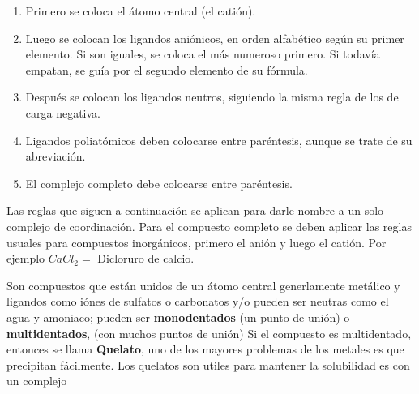 \begin{enumerate}
	\item Primero se coloca el átomo central (el catión).
	\item Luego se colocan los ligandos aniónicos, en orden alfabético según su primer elemento.
	      Si son iguales, se coloca el más numeroso primero. Si todavía empatan, se guía por el
	      segundo elemento de su fórmula.
	\item Después se colocan los ligandos neutros, siguiendo la misma regla de los de carga
	      negativa.
	\item Ligandos poliatómicos deben colocarse entre paréntesis, aunque se trate de su
	      abreviación.
	\item El complejo completo debe colocarse entre paréntesis.
\end{enumerate}

Las reglas que siguen a continuación se aplican para darle nombre a un solo complejo de
coordinación. Para el compuesto completo se deben aplicar las reglas usuales para compuestos
inorgánicos, primero el anión y luego el catión. Por ejemplo $CaCl_2 =$ Dicloruro de calcio.


Son compuestos que están unidos de un átomo central generlamente metálico y ligandos como
iónes de sulfatos o carbonatos y/o pueden ser neutras como el agua y amoniaco; pueden ser
\textbf{monodentados} (un punto de unión) o \textbf{multidentados}, (con muchos puntos de unión)
Si el compuesto es multidentado, entonces se llama \textbf{Quelato}, uno de los mayores problemas
de los metales es que precipitan fácilmente.
Los quelatos son utiles para mantener la solubilidad es con un complejo


